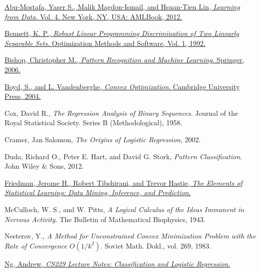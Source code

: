 \begin{thebibliography}{99}

    \href{http://work.caltech.edu/telecourse.html}{Abu-Mostafa, Yaser S., Malik Magdon-Ismail, and Hsuan-Tien Lin, \textit{Learning from Data}. Vol. 4. New York, NY, USA: AMLBook, 2012.}

    \href{http://citeseerx.ist.psu.edu/viewdoc/download?doi=10.1.1.23.3307&rep=rep1&type=pdf}{Bennett, K. P., \textit{Robust Linear Programming Discrimination of Two Linearly Separable Sets}. Optimization Methods and Software, Vol. 1, 1992.}

    \href{http://users.isr.ist.utl.pt/~wurmd/Livros/school/Bishop%20-%20Pattern%20Recognition%20And%20Machine%20Learning%20-%20Springer%20%202006.pdf}{Bishop, Christopher M., \textit{Pattern Recognition and Machine Learning}. Springer, 2006.}

    \href{http://stanford.edu/~boyd/cvxbook/}{Boyd, S., and L. Vandenberghe, \textit{Convex Optimization}. Cambridge University Press, 2004.}

    {Cox, David R., \textit{The Regression Analysis of Binary Sequences}. Journal of the Royal Statistical Society. Series B (Methodological), 1958.}

    {Cramer, Jan Salomon, \textit{The Origins of Logistic Regression}, 2002.}

    {Duda, Richard O., Peter E. Hart, and David G. Stork, \textit{Pattern Classification}. John Wiley \& Sons, 2012.}

    \href{https://statweb.stanford.edu/~tibs/}{Friedman, Jerome H., Robert Tibshirani, and Trevor Hastie, \textit{The Elements of Statistical Learning: Data Mining, Inference, and Prediction}.}

    {McCulloch, W. S., and W. Pitts, \textit{A Logical Calculus of the Ideas Immanent in Nervous Activity}. The Bulletin of Mathematical Biophysics, 1943.}

    {Nesterov, Y., \textit{A Method for Unconstrained Convex Minimization Problem with the Rate of Convergence \(O(1/k^2)\)}. Soviet Math. Dokl., vol. 269, 1983.}

    \href{https://datajobs.com/data-science-repo/Generalized-Linear-Models-[Andrew-Ng].pdf}{Ng, Andrew, \textit{CS229 Lecture Notes: Classification and Logistic Regression}.}


\end{thebibliography}
